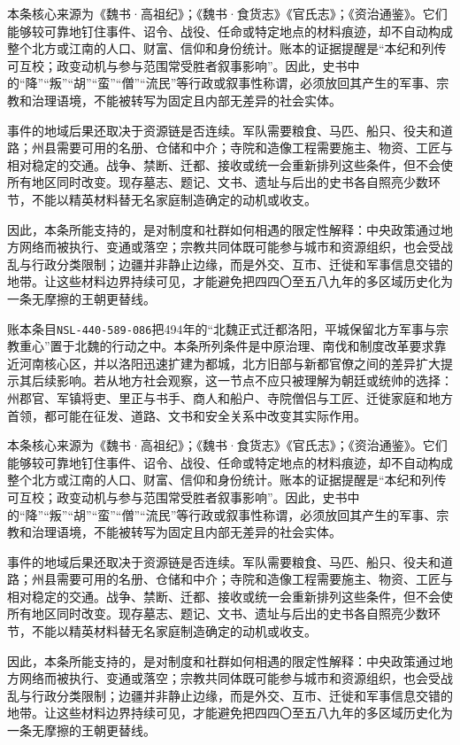 本条核心来源为《魏书·高祖纪》；《魏书·食货志》《官氏志》；《资治通鉴》。它们能够较可靠地钉住事件、诏令、战役、任命或特定地点的材料痕迹，却不自动构成整个北方或江南的人口、财富、信仰和身份统计。账本的证据提醒是“本纪和列传可互校；政变动机与参与范围常受胜者叙事影响”。因此，史书中的“降”“叛”“胡”“蛮”“僧”“流民”等行政或叙事性称谓，必须放回其产生的军事、宗教和治理语境，不能被转写为固定且内部无差异的社会实体。

事件的地域后果还取决于资源链是否连续。军队需要粮食、马匹、船只、役夫和道路；州县需要可用的名册、仓储和中介；寺院和造像工程需要施主、物资、工匠与相对稳定的交通。战争、禁断、迁都、接收或统一会重新排列这些条件，但不会使所有地区同时改变。现存墓志、题记、文书、遗址与后出的史书各自照亮少数环节，不能以精英材料替无名家庭制造确定的动机或收支。

因此，本条所能支持的，是对制度和社群如何相遇的限定性解释：中央政策通过地方网络而被执行、变通或落空；宗教共同体既可能参与城市和资源组织，也会受战乱与行政分类限制；边疆并非静止边缘，而是外交、互市、迁徙和军事信息交错的地带。让这些材料边界持续可见，才能避免把四四〇至五八九年的多区域历史化为一条无摩擦的王朝更替线。

账本条目\texttt{NSL-440-589-086}把494年的“北魏正式迁都洛阳，平城保留北方军事与宗教重心”置于北魏的行动之中。本条所列条件是中原治理、南伐和制度改革要求靠近河南核心区，并以洛阳迅速扩建为都城，北方旧部与新都官僚之间的差异扩大提示其后续影响。若从地方社会观察，这一节点不应只被理解为朝廷或统帅的选择：州郡官、军镇将吏、里正与书手、商人和船户、寺院僧侣与工匠、迁徙家庭和地方首领，都可能在征发、道路、文书和安全关系中改变其实际作用。

本条核心来源为《魏书·高祖纪》；《魏书·食货志》《官氏志》；《资治通鉴》。它们能够较可靠地钉住事件、诏令、战役、任命或特定地点的材料痕迹，却不自动构成整个北方或江南的人口、财富、信仰和身份统计。账本的证据提醒是“本纪和列传可互校；政变动机与参与范围常受胜者叙事影响”。因此，史书中的“降”“叛”“胡”“蛮”“僧”“流民”等行政或叙事性称谓，必须放回其产生的军事、宗教和治理语境，不能被转写为固定且内部无差异的社会实体。

事件的地域后果还取决于资源链是否连续。军队需要粮食、马匹、船只、役夫和道路；州县需要可用的名册、仓储和中介；寺院和造像工程需要施主、物资、工匠与相对稳定的交通。战争、禁断、迁都、接收或统一会重新排列这些条件，但不会使所有地区同时改变。现存墓志、题记、文书、遗址与后出的史书各自照亮少数环节，不能以精英材料替无名家庭制造确定的动机或收支。

因此，本条所能支持的，是对制度和社群如何相遇的限定性解释：中央政策通过地方网络而被执行、变通或落空；宗教共同体既可能参与城市和资源组织，也会受战乱与行政分类限制；边疆并非静止边缘，而是外交、互市、迁徙和军事信息交错的地带。让这些材料边界持续可见，才能避免把四四〇至五八九年的多区域历史化为一条无摩擦的王朝更替线。

